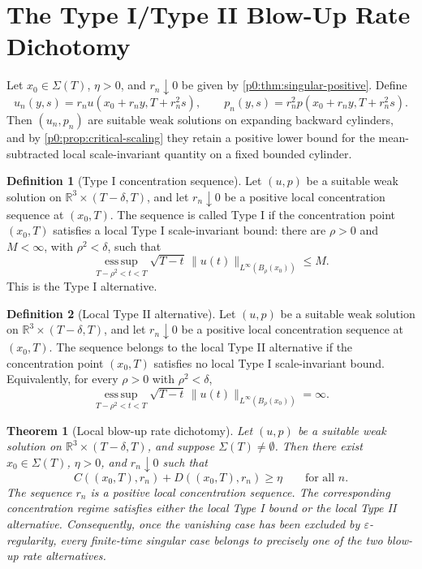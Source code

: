 \documentclass[11pt]{amsart}
\theoremstyle{plain}
\newtheorem{theorem}{Theorem}[section]
\theoremstyle{definition}
\newtheorem{definition}[definition]{Definition}
\theoremstyle{remark}
\numberwithin{equation}{section}
\begin{document}
\section{The Type I/Type II Blow-Up Rate Dichotomy}

Let \(x_0\in\Sigma(T)\), \(\eta>0\), and \(r_n\downarrow0\) be given by
\cref{p0:thm:singular-positive}.  Define
\[
  u_n(y,s)=r_nu(x_0+r_ny,T+r_n^2s),
  \qquad
  p_n(y,s)=r_n^2p(x_0+r_ny,T+r_n^2s).
\]
Then \((u_n,p_n)\) are suitable weak solutions on expanding backward
cylinders, and by \cref{p0:prop:critical-scaling} they retain a positive lower
bound for the mean-subtracted local scale-invariant quantity on a fixed
bounded cylinder.

\begin{definition}[Type I concentration sequence]
\label{p0:def:typeI-concentration}
Let \((u,p)\) be a suitable weak solution on
\(\mathbb R^3\times(T-\delta,T)\), and let \(r_n\downarrow0\) be a positive
local concentration sequence at \((x_0,T)\).  The sequence is called Type I
if the concentration point \((x_0,T)\) satisfies a local Type I
scale-invariant bound:
there are \(\rho>0\) and \(M<\infty\), with \(\rho^2<\delta\), such that
\[
  \operatorname*{ess\,sup}_{T-\rho^2<t<T}
  \sqrt{T-t}\,\|u(t)\|_{L^\infty(B_\rho(x_0))}\le M.
\]
This is the Type I alternative.
\end{definition}

\begin{definition}[Local Type II alternative]
\label{p0:def:typeII-alternative}
Let \((u,p)\) be a suitable weak solution on
\(\mathbb R^3\times(T-\delta,T)\), and let \(r_n\downarrow0\) be a positive
local concentration sequence at \((x_0,T)\).  The sequence belongs to the local
Type II alternative if the concentration point \((x_0,T)\) satisfies no
local Type I scale-invariant bound.  Equivalently, for every \(\rho>0\) with
\(\rho^2<\delta\),
\[
  \operatorname*{ess\,sup}_{T-\rho^2<t<T}
  \sqrt{T-t}\,\|u(t)\|_{L^\infty(B_\rho(x_0))}=\infty.
\]
\end{definition}

\begin{theorem}[Local blow-up rate dichotomy]\label{p0:thm:typeI-typeII-dichotomy}
Let \((u,p)\) be a suitable weak solution on
\(\mathbb R^3\times(T-\delta,T)\), and suppose \(\Sigma(T)\ne\emptyset\).
Then there exist \(x_0\in\Sigma(T)\),
\(\eta>0\), and \(r_n\downarrow0\) such that
\[
  C((x_0,T),r_n)+D((x_0,T),r_n)\ge\eta
  \qquad\text{for all }n.
\]
The sequence \(r_n\) is a positive local concentration sequence.  The
corresponding concentration regime satisfies either the local Type I bound or
the local Type II alternative.  Consequently, once the vanishing case has been
excluded by \(\varepsilon\)-regularity, every finite-time singular case belongs
to precisely one of the two blow-up rate alternatives.
\end{theorem}
\end{document}
